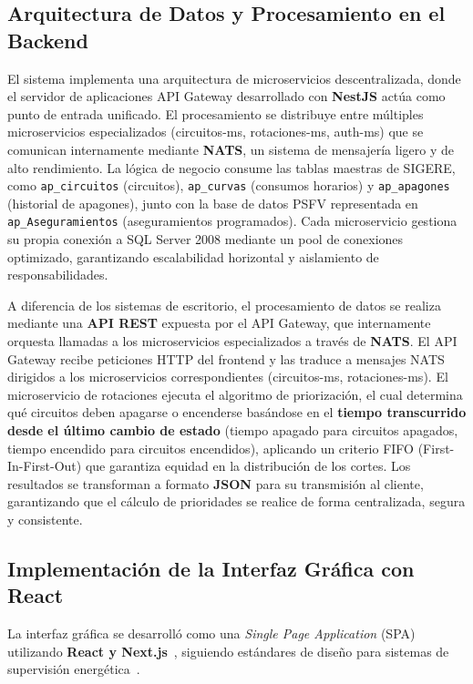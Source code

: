 \subsection{Arquitectura de Datos y Procesamiento en el Backend}

El sistema implementa una arquitectura de microservicios descentralizada, donde el servidor de aplicaciones API Gateway desarrollado con \textbf{NestJS} actúa como punto de entrada unificado. El procesamiento se distribuye entre múltiples microservicios especializados (circuitos-ms, rotaciones-ms, auth-ms) que se comunican internamente mediante \textbf{NATS}, un sistema de mensajería ligero y de alto rendimiento. La lógica de negocio consume las tablas maestras de SIGERE, como \texttt{ap\_circuitos} (circuitos), \texttt{ap\_curvas} (consumos horarios) y \texttt{ap\_apagones} (historial de apagones), junto con la base de datos PSFV representada en \texttt{ap\_Aseguramientos} (aseguramientos programados). Cada microservicio gestiona su propia conexión a SQL Server 2008 mediante un pool de conexiones optimizado, garantizando escalabilidad horizontal y aislamiento de responsabilidades.

A diferencia de los sistemas de escritorio, el procesamiento de datos se realiza mediante una \textbf{API REST} expuesta por el API Gateway, que internamente orquesta llamadas a los microservicios especializados a través de \textbf{NATS}. El API Gateway recibe peticiones HTTP del frontend y las traduce a mensajes NATS dirigidos a los microservicios correspondientes (circuitos-ms, rotaciones-ms). El microservicio de rotaciones ejecuta el algoritmo de priorización, el cual determina qué circuitos deben apagarse o encenderse basándose en el \textbf{tiempo transcurrido desde el último cambio de estado} (tiempo apagado para circuitos apagados, tiempo encendido para circuitos encendidos), aplicando un criterio FIFO (First-In-First-Out) que garantiza equidad en la distribución de los cortes. Los resultados se transforman a formato \textbf{JSON} para su transmisión al cliente, garantizando que el cálculo de prioridades se realice de forma centralizada, segura y consistente.

\subsection{Implementación de la Interfaz Gráfica con React}

La interfaz gráfica se desarrolló como una \textit{Single Page Application} (SPA) utilizando \textbf{React y Next.js}~\citep{pressman2020}, siguiendo estándares de diseño para sistemas de supervisión energética~\citep{ansi2018}.

